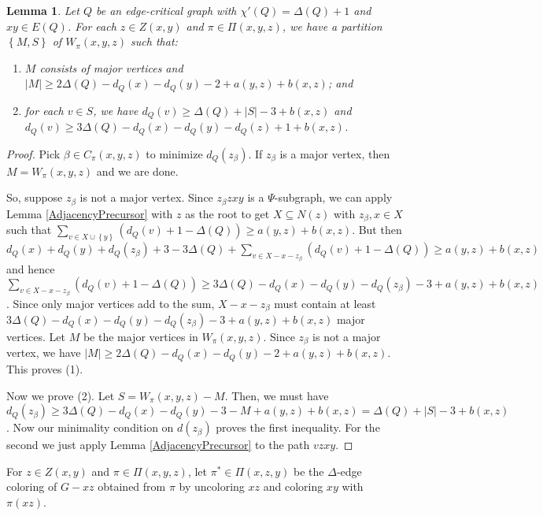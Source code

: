\documentclass[12pt,reqno]{amsart}
\theoremstyle{plain}
\newtheorem{lem}[thm]{Lemma}
\theoremstyle{definition}
\theoremstyle{remark}
\newcommand{\set}[1]{\left\{ #1 \right\}}
\newcommand{\card}[1]{\left|#1\right|}
\begin{document}
\begin{lem}\label{WoodallImprovementW}
Let $Q$ be an edge-critical graph with $\chi'(Q) = \Delta(Q) + 1$ and $xy \in E(Q)$.  For each $z \in Z(x, y)$ and $\pi \in \Pi(x,y,z)$, we have a partition $\set{M, S}$ of $W_\pi(x, y, z)$ such that:
\begin{enumerate}
\item $M$ consists of major vertices and $\card{M} \ge 2\Delta(Q) - d_Q(x) - d_Q(y) - 2 + a(y, z) + b(x, z)$; and
\item for each $v \in S$, we have $d_Q(v) \ge \Delta(Q) + \card{S} - 3 + b(x, z)$ and $d_Q(v) \ge 3\Delta(Q) - d_Q(x) - d_Q(y) - d_Q(z) + 1 + b(x, z)$. 
\end{enumerate}
\end{lem}
\begin{proof}
Pick $\beta \in C_\pi(x,y,z)$ to minimize $d_Q(z_\beta)$.  If $z_\beta$ is a major vertex, then $M = W_\pi(x, y, z)$ and we are done.

So, suppose $z_\beta$ is not a major vertex. Since $z_\beta zxy$ is a $\Psi$-subgraph, we can apply Lemma \ref{AdjacencyPrecursor} with $z$ as the root to get $X \subseteq N(z)$ with $z_\beta, x \in X$ such that $\sum_{v \in X \cup \set{y}} (d_Q(v) + 1 - \Delta(Q)) \ge a(y, z) + b(x, z)$.  But then $d_Q(x) + d_Q(y) + d_Q(z_\beta) + 3 - 3\Delta(Q) + \sum_{v \in X - x - z_\beta} (d_Q(v) + 1 - \Delta(Q)) \ge a(y, z) + b(x, z)$ and hence $\sum_{v \in X - x - z_\beta} (d_Q(v) + 1 - \Delta(Q)) \ge 3\Delta(Q) - d_Q(x) - d_Q(y) - d_Q(z_\beta) - 3 + a(y, z) + b(x, z)$.  Since only major vertices add to the sum, $X - x - z_\beta$ must contain at least $3\Delta(Q) - d_Q(x) - d_Q(y) - d_Q(z_\beta) - 3 + a(y, z) + b(x, z)$ major vertices.  Let $M$ be the major vertices in $W_\pi(x, y, z)$. Since $z_\beta$ is not a major vertex, we have $\card{M} \ge 2\Delta(Q) - d_Q(x) - d_Q(y) - 2 + a(y, z) + b(x, z)$.  This proves (1). 

Now we prove (2). Let $S = W_\pi(x, y, z) - M$.  Then, we must have $d_Q(z_\beta) \ge 3\Delta(Q) - d_Q(x) - d_Q(y) - 3 - M + a(y, z) + b(x, z) = \Delta(Q) + \card{S} - 3 + b(x, z)$.  Now our minimality condition on $d(z_\beta)$ proves the first inequality.  For the second  we just apply Lemma \ref{AdjacencyPrecursor} to the path $vzxy$.
\end{proof}

For $z \in Z(x, y)$ and $\pi \in \Pi(x,y,z)$, let $\pi^* \in \Pi(x, z, y)$ be the $\Delta$-edge coloring of $G-xz$ obtained from $\pi$ by uncoloring $xz$ and coloring $xy$ with $\pi(xz)$.
\end{document}
